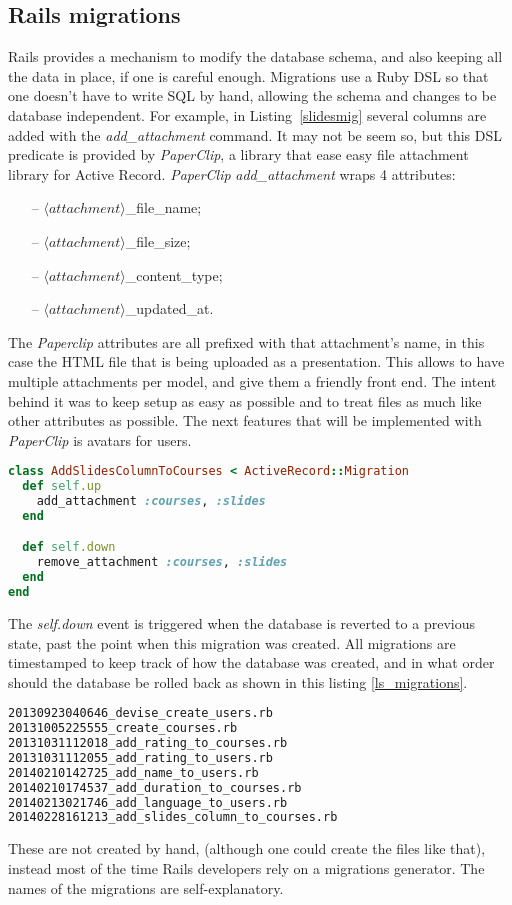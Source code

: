 \subsection{Rails migrations}
Rails provides a mechanism to modify the database schema, and also keeping all the
data in place, if one is careful enough. Migrations use a Ruby DSL so that one
doesn't have to write SQL by hand, allowing the schema and changes to be database
independent. For example, in Listing~\ref{slidesmig} several columns are added
with the \textit{add\_attachment} command. It may not be seem so, but this DSL predicate
is provided by \textit{PaperClip}, a library that ease easy file attachment library for
Active Record.
\textit{PaperClip} \textit{add\_attachment} wraps 4 attributes:
\begin{enumerate}
    \item[--] $\langle attachment\rangle$\_file\_name;
    \item[--] $\langle attachment\rangle$\_file\_size;
    \item[--] $\langle attachment\rangle$\_content\_type;
    \item[--] $\langle attachment\rangle$\_updated\_at.
\end{enumerate}
The \textit{Paperclip} attributes are all prefixed with that attachment's name, in this case
the HTML file that is being uploaded as a presentation.
This allows to have multiple attachments per model, and give them a friendly front end.
The intent behind it was to keep setup as easy as possible and to treat files as much like other attributes as possible.
The next features that will be implemented with \textit{PaperClip} is avatars for users.
\begin{lstlisting}[language=Ruby, caption={Slides migration}, label=slidesmig]
class AddSlidesColumnToCourses < ActiveRecord::Migration
  def self.up
    add_attachment :courses, :slides
  end

  def self.down
    remove_attachment :courses, :slides
  end
end
\end{lstlisting}
The \textit{self.down} event is triggered when the database is reverted to a previous state,
past the point when this migration was created. All migrations are timestamped
to keep track of how the database was created, and in what order should the database
be rolled back  as shown in this listing \ref{ls_migrations}. \begin{lstlisting}[language=Bash, caption={The migration directory}, label=ls_migrations]
20130923040646_devise_create_users.rb
20131005225555_create_courses.rb
20131031112018_add_rating_to_courses.rb
20131031112055_add_rating_to_users.rb
20140210142725_add_name_to_users.rb
20140210174537_add_duration_to_courses.rb
20140213021746_add_language_to_users.rb
20140228161213_add_slides_column_to_courses.rb
\end{lstlisting}
These are not created by hand, (although one could create the files like that),
instead most of the time Rails developers rely on a migrations generator. The
names of the migrations are self-explanatory.

